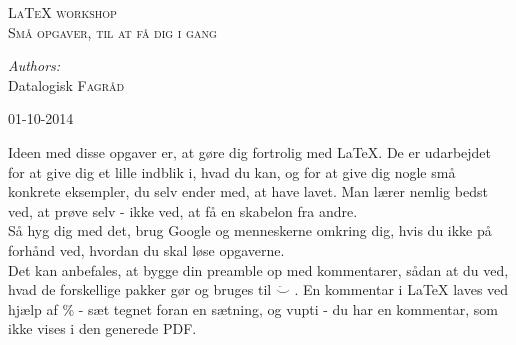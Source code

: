 \documentclass[12pt]{article}
\begin{document}
\begin{titlepage}

\centering 

\textsc{\Large \LaTeX{} workshop}\\[0.5cm] 
\textsc{\large Små opgaver, til at få dig i gang}\\[0.5cm] 

\vfill

\emph{Authors:}
\\
Datalogisk \textsc{Fagråd} 
\vspace{20mm}

{\large 01-10-2014}\\[3cm] 

\end{titlepage}

\tableofcontents
\newpage


Ideen med disse opgaver er, at gøre dig fortrolig med \LaTeX{}. De er udarbejdet for at give dig et lille indblik i, hvad du kan, og for at give dig nogle små konkrete eksempler, du selv ender med, at have lavet. Man lærer nemlig bedst ved, at prøve selv - ikke ved, at få en skabelon fra andre. \\

Så hyg dig med det, brug Google og menneskerne omkring dig, hvis du ikke på forhånd ved, hvordan du skal løse opgaverne. \\

Det kan anbefales, at bygge din preamble op med kommentarer, sådan at du ved, hvad de forskellige pakker gør og bruges til $\ddot\smile$ . En kommentar i \LaTeX{} laves ved hjælp af \% - sæt tegnet foran en sætning, og vupti - du har en kommentar, som ikke vises i den generede PDF. 
\end{document}
